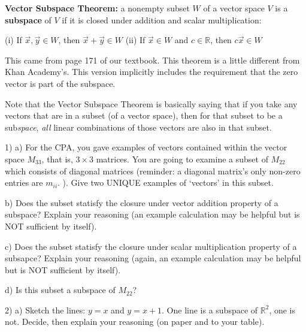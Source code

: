\documentclass{article}
\begin{document}
\begin{flushleft}
\textbf{Vector Subspace Theorem:} a nonempty subset $W$ of a vector space $V$ is a \textbf{subspace} of $V$ if it is closed under addition and scalar multiplication:

\vspace{0.2in}

(i) If $\vec{x},\vec{y}\in W$, then $\vec{x}+\vec{y}\in W$ \hspace{0.5in} (ii) If $\vec{x}\in W$ and $c\in \mathbb{R}$, then $c\vec{x} \in W$

\vspace{0.2in}

This came from page 171 of our textbook.  This theorem is a little different from Khan Academy's.  This version implicitly includes the requirement that the zero vector is part of the subspace.

\vspace{0.2in}

Note that the Vector Subspace Theorem is basically saying that if you take any vectors that are in a subset (of a vector space), then for that subset to be a sub\emph{space}, \emph{all} linear combinations of those vectors are also in that subset.

\vspace{0.2in}
1) a) For the CPA, you gave examples of vectors contained within the vector space $M_{33}$, that is, $3\times 3$ matrices.  You are going to examine a subset of $M_{22}$ which consists of diagonal matrices (reminder: a diagonal matrix's only non-zero entries are $m_{ii}$. ).  Give two UNIQUE examples of `vectors' in this subset.

\vspace{1in}

b) Does the subset statisfy the closure under vector addition property of a subspace?  Explain your reasoning (an example calculation may be helpful but is NOT sufficient by itself).

\vspace{2in}

c) Does the subset statisfy the closure under scalar multiplication property of a subsapce? Explain your reasoning (again, an example calculation may be helpful but is NOT sufficient by itself).

\vspace{2in}

d) Is this subset a subspace of $M_{22}$?

\vspace{1in}

2) a) Sketch the lines: $y=x$ and $ y=x+1$.  One line is a subspace of $\mathbb{R}^2$, one is not. Decide, then explain your reasoning (on paper and to your table).


\end{flushleft}
\end{document}

